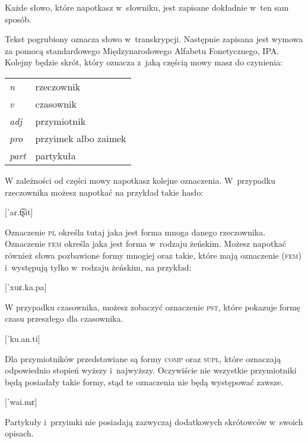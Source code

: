 Każde słowo, które napotkasz w~słowniku, jest zapisane dokładnie w~ten sam
sposób.

Tekst pogrubiony oznacza słowo w~transkrypcji. Następnie zapisana jest wymowa za
pomocą standardowego Międzynarodowego Alfabetu Fonetycznego, IPA. Kolejny będzie
skrót, który oznacza z~jaką częścią mowy masz do czynienia:

\begin{table}[h]
\begin{tabular}{ll}
\emph{n}    & rzeczownik           \\
\emph{v}    & czasownik            \\
\emph{adj}  & przymiotnik          \\
\emph{pro}  & przyimek albo zaimek \\
\emph{part} & partykuła           
\end{tabular}
\end{table}

W zależności od części mowy napotkasz kolejne oznaczenia. W~przypadku
rzeczownika możesz napotkać na przykład takie hasło:

[ˈar.t͡ʂit]
\skipline

Oznaczenie \textsc{pl} określa tutaj jaka jest forma mnoga danego rzeczownika.
Oznaczenie \textsc{fem} określa jaka jest forma w~rodzaju żeńskim. Możesz
napotkać również słowa pozbawione formy mnogiej oraz takie, które mają
oznaczenie (\textsc{fem}) i~występują tylko w~rodzaju żeńskim, na przykład:

[ˈxuɛ.ka.pa]
\skipline

W przypadku czasownika, możesz zobaczyć oznaczenie \textsc{pst}, które pokazuje
formę czasu przeszłego dla czasownika.

[ˈku.an.ti]
\skipline

Dla przymiotników przedstawiane są formy \textsc{comp} oraz \textsc{supl}, które
oznaczają odpowiednio stopień wyższy i~najwyższy. Oczywiście nie wszystkie
przymiotniki będą posiadały takie formy, stąd te oznaczenia nie będą występować
zawsze.

[ˈwai.mɛ]
\skipline

Partykuły i~przyimki nie posiadają zazwyczaj dodatkowych skrótowców w~swoich
opisach.

